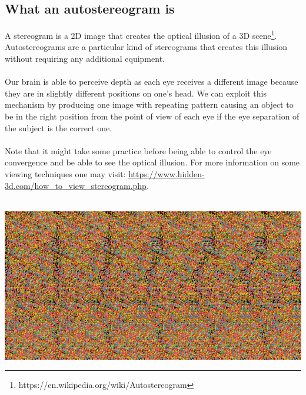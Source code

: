 \documentclass[12pt, a4paper]{article}
\begin{document}
\subsection{What an autostereogram is}
A stereogram is a 2D image that creates the optical illusion of a 3D scene\footnote{https://en.wikipedia.org/wiki/Autostereogram}.
Autostereograms are a particular kind of stereograms
that creates this illusion without requiring any additional equipment.\\\\
Our brain is able to perceive depth as each eye receives a different image because they are in slightly different positions on one's head.
We can exploit this mechanism by producing one image with repeating pattern causing an object to be in the right position from the point of view of each eye
if the eye separation of the subject is the correct one.\\\\
Note that it might take some practice before being able to control the eye convergence and be able to see
the optical illusion. For more information on some viewing techniques one may visit: \url{https://www.hidden-3d.com/how_to_view_stereogram.php}.\\\\
\begin{center}
    \centering
    \includegraphics[width=1.0\textwidth]{img/shark.png}
\end{center}
\clearpage
\end{document}

